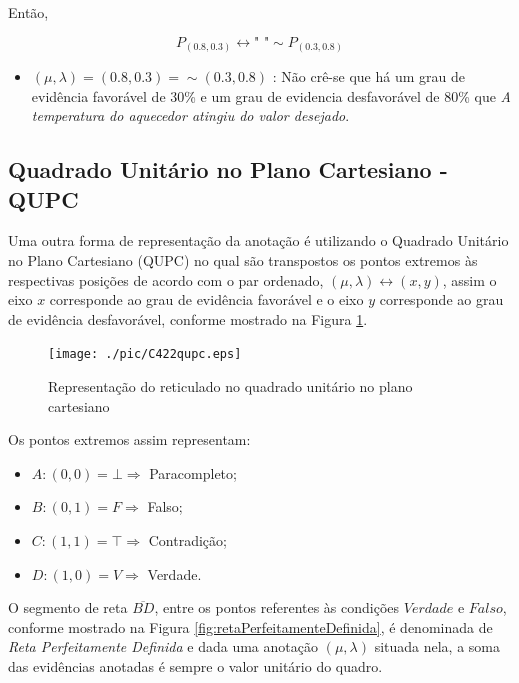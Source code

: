Então,
\begin{center}
\begin{equation}
P_{(0.8,0.3)} \leftrightarrow \textrm{"   "} \sim P_{(0.3,0.8)}
\end{equation}
\end{center}

\begin{itemize}
\item 
$(\mu, \lambda ) = (0.8,0.3) = \sim (0.3,0.8)$ : Não crê-se que há um grau de evidência favorável de 30\% e um grau de evidencia desfavorável de 80\% que \emph{A temperatura do aquecedor atingiu do valor desejado}.
\end{itemize}



\subsection{Quadrado Unitário no Plano Cartesiano - QUPC}

Uma outra forma de representação da anotação é utilizando o Quadrado Unitário no Plano Cartesiano (QUPC) no qual são transpostos os pontos extremos às respectivas posições de acordo com o par ordenado,  $(\mu, \lambda ) \leftrightarrow (x,y) $, assim o eixo $x$ corresponde ao grau de evidência favorável e o eixo $y$ corresponde ao grau de evidência desfavorável, conforme mostrado na Figura \ref{fig:reticuladoQUPC}.



\begin{figure}[!htb]
\center\texttt{[image: ./pic/C422qupc.eps]}
\caption{Representação do reticulado no quadrado unitário no plano cartesiano}
\label{fig:reticuladoQUPC}
\end{figure}

Os pontos extremos assim representam:

\begin{itemize}
\item $A: (0,0) = \bot \Rightarrow $ Paracompleto;
\item $B: (0,1) = F \Rightarrow $ Falso;
\item $C: (1,1) = \top \Rightarrow $ Contradição;
\item $D: (1,0) = V \Rightarrow $ Verdade.
\end{itemize}

O segmento de reta $\overline{BD}$, entre os pontos referentes às condições $Verdade$ e $Falso$, conforme mostrado na Figura \ref{fig:retaPerfeitamenteDefinida}, é denominada de \emph{Reta Perfeitamente Definida} e dada uma anotação $(\mu, \lambda )$ situada nela, a soma das evidências anotadas é sempre o valor unitário do quadro. 

